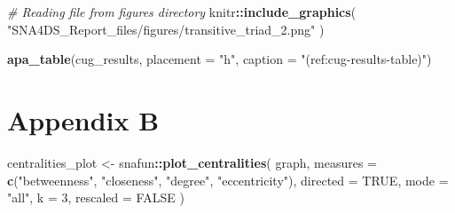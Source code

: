 \documentclass[
  man,floatsintext]{apa6}
\newenvironment{Shaded}{\begin{snugshade}}{\end{snugshade}}
\newcommand{\AttributeTok}[1]{\textcolor[rgb]{0.13,0.29,0.53}{#1}}
\newcommand{\CommentTok}[1]{\textcolor[rgb]{0.56,0.35,0.01}{\textit{#1}}}
\newcommand{\ConstantTok}[1]{\textcolor[rgb]{0.56,0.35,0.01}{#1}}
\newcommand{\DecValTok}[1]{\textcolor[rgb]{0.00,0.00,0.81}{#1}}
\newcommand{\FunctionTok}[1]{\textcolor[rgb]{0.13,0.29,0.53}{\textbf{#1}}}
\newcommand{\NormalTok}[1]{#1}
\newcommand{\OtherTok}[1]{\textcolor[rgb]{0.56,0.35,0.01}{#1}}
\newcommand{\SpecialCharTok}[1]{\textcolor[rgb]{0.81,0.36,0.00}{\textbf{#1}}}
\newcommand{\StringTok}[1]{\textcolor[rgb]{0.31,0.60,0.02}{#1}}
\begin{document}
\begin{Shaded}
\begin{Highlighting}[]
\CommentTok{\# Reading file from figures directory}
\NormalTok{knitr}\SpecialCharTok{::}\FunctionTok{include\_graphics}\NormalTok{(}
  \StringTok{"SNA4DS\_Report\_files/figures/transitive\_triad\_2.png"}
\NormalTok{  )}
\end{Highlighting}
\end{Shaded}

\begin{Shaded}
\begin{Highlighting}[]
\FunctionTok{apa\_table}\NormalTok{(cug\_results,}
          \AttributeTok{placement =} \StringTok{"h"}\NormalTok{,}
          \AttributeTok{caption =} \StringTok{"(ref:cug{-}results{-}table)"}\NormalTok{)}
\end{Highlighting}
\end{Shaded}

\newpage

\section*{Appendix B}\label{appendix-b}



\begin{Shaded}
\begin{Highlighting}[]
\NormalTok{centralities\_plot }\OtherTok{\textless{}{-}}\NormalTok{ snafun}\SpecialCharTok{::}\FunctionTok{plot\_centralities}\NormalTok{(}
\NormalTok{  graph,}
  \AttributeTok{measures =} \FunctionTok{c}\NormalTok{(}\StringTok{"betweenness"}\NormalTok{, }\StringTok{"closeness"}\NormalTok{, }\StringTok{"degree"}\NormalTok{, }\StringTok{"eccentricity"}\NormalTok{), }
  \AttributeTok{directed =} \ConstantTok{TRUE}\NormalTok{,}
  \AttributeTok{mode =} \StringTok{"all"}\NormalTok{,}
  \AttributeTok{k =} \DecValTok{3}\NormalTok{,}
  \AttributeTok{rescaled =} \ConstantTok{FALSE}
\NormalTok{)}
\end{Highlighting}
\end{Shaded}
\end{document}

